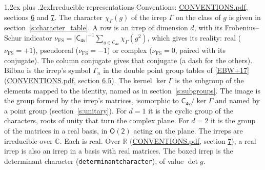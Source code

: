 \documentclass[10pt,a4paper]{article}
\makeatletter
\renewcommand\section{\@startsection{section}{1}{\z@}{-3ex plus -1ex minus -.2ex}%
  {1.2ex plus .2ex}{\normalfont\large\sffamily\bfseries\color{parttitle}}}
\numberwithin{equation}{section}
\newcommand{\grp}[1]{\mathsf{#1}}
\newcommand{\irchar}[1]{\chi_{#1}}
\newcommand{\fsind}{\nu_{\mathrm{FS}}}
\makeatother
\begin{document}
\section{Irreducible representations}\label{s:irreps}
Conventions: \href{../../CONVENTIONS.pdf}{CONVENTIONS.pdf}, sections \href{../../CONVENTIONS.pdf\#conv.6}{6} and \href{../../CONVENTIONS.pdf\#conv.7}{7}.
\leavevmode\label{n:function.character}\label{n:irrep.Gamma}The character $\irchar{\Gamma}(g)$ of the irrep $\Gamma$ on the class of $g$ is given in section~\ref{s:character_table}.
\leavevmode\label{n:index.dimension}\label{n:index.frobenius}\label{n:head.irrep}\label{n:head.reality}A row is an irrep of dimension $d$, with its Frobenius--Schur indicator $\fsind = |\grp{C_{4v}}|^{-1}\allowbreak\sum_{g\in\grp{C_{4v}}}\irchar{\Gamma}(g^2)$, which gives its reality: real ($\fsind = +1$), pseudoreal ($\fsind = -1$) or complex ($\fsind = 0$, paired with its conjugate). \label{n:head.conjugate}The column conjugate gives that conjugate (a dash for the others). \label{n:head.bilbao}\label{n:irrep.alias.gamma}Bilbao is the irrep's symbol $\Gamma_n$ in the double point group tables of [\href{../../../REFERENCES.pdf\#ref.EBW+17}{EBW+17}] (\href{../../CONVENTIONS.pdf}{CONVENTIONS.pdf}, section \href{../../CONVENTIONS.pdf\#conv.6.5}{6.5}). \label{n:head.kernel}The kernel $\ker\Gamma$ is the subgroup of the elements mapped to the identity, named as in section~\ref{s:subgroups}. \label{n:head.image}The image is the group formed by the irrep's matrices, isomorphic to $\grp{C_{4v}}/\ker\Gamma$ and named by a point group (section~\ref{s:unitary}). For $d = 1$ it is the cyclic group of the characters, roots of unity that turn the complex plane. For $d = 2$ it is the group of the matrices in a real basis, in $\grp{O(2)}$ acting on the plane. The irreps are irreducible over $\mathbb{C}$. Each is real. Over $\mathbb{R}$ (\href{../../CONVENTIONS.pdf}{CONVENTIONS.pdf}, section \href{../../CONVENTIONS.pdf\#conv.7}{7}), a real irrep is also an irrep in a basis with real matrices. \label{n:mark.determinant}The boxed irrep is the determinant character (\texttt{determinantcharacter}), of value $\det g$.
\setlength{\emergencystretch}{2em}\par\setlength{\emergencystretch}{0pt}
\end{document}
